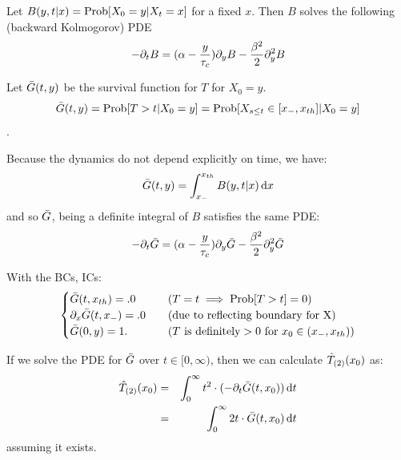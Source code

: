 \documentclass{article}
\begin{document}
Let $B(y,t|x) = \operatorname{Prob}[X_0 = y| X_t = x]$ for a fixed $x$. Then $B$ solves the
following (backward Kolmogorov) PDE
\begin{equation}
-{\partial}_t B = ({\alpha} - \frac y{{ \tau_{c} }}){\partial}_yB - \frac {{\beta}^2} 2 {\partial}_y^2 B
\label{eq:backward_Xdensity}
\end{equation}

Let ${ \bar{G} }(t,y)$ be the survival function for $T$ for $X_0 = y$. 
$${ \bar{G} }(t,y) = \operatorname{Prob}[T>t | X_0 = y] = \operatorname{Prob}[X_{s\leq t} \in [{ x_{-} },
{ x_{th} }] | X_0 = y]$$.

Because the dynamics do not depend explicitly on time, we have:
$$
{ \bar{G} }(t,y) = \int_{ x_{-} }^{ x_{th} } B(y,t|x) \, \mathrm{d} x
$$
and so ${ \bar{G} }$, being a definite integral of $B$ satisfies the same PDE:
\begin{equation}
-{\partial}_t { \bar{G} } = ({\alpha} - \frac y{{ \tau_{c} }}) {\partial}_y{ \bar{G} } - \frac {{\beta}^2} 2 {\partial}_y^2 { \bar{G} }
\label{eq:backward_SDF}
\end{equation}

With the BCs, ICs:
\begin{equation}
\begin{cases}
{ \bar{G} }(t,{ x_{th} }) = .0 & \quad (T = t \implies \operatorname{Prob}[T>t] = 0)
\\
{\partial}_x { \bar{G} }(t,{ x_{-} }) = .0  & \quad (\textrm{due to reflecting boundary for X})
\\
{ \bar{G} }(0, y) = 1. & \quad (T \textrm{ is definitely} > 0 \textrm{ for } x_0 \in
({ x_{-} }, { x_{th} }) )
\end{cases}
\end{equation}

If we solve the PDE for ${ \bar{G} }$ over $t \in [0,\infty)$, then we can calculate
${ \hat{T}_{(2)} }(x_0)$ as:
\begin{eqnarray}
{ \hat{T}_{(2)} }(x_0) &=& \int_0^\infty t^2 \cdot (-{\partial}_t{ \bar{G} }(t,x_0)) \, \mathrm{d} t
\\
		   &=& \int_0^\infty 2t \cdot { \bar{G} }(t,x_0) \, \mathrm{d} t
\end{eqnarray}
assuming it exists.
 
\end{document}
